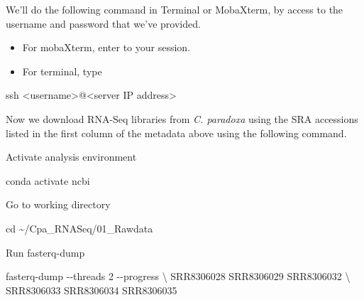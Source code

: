 \documentclass[
  letterpaper,
  DIV=11,
  numbers=noendperiod]{scrreprt}
\newenvironment{Shaded}{\begin{snugshade}}{\end{snugshade}}
\newcommand{\AttributeTok}[1]{\textcolor[rgb]{0.40,0.45,0.13}{#1}}
\newcommand{\BuiltInTok}[1]{\textcolor[rgb]{0.00,0.23,0.31}{#1}}
\newcommand{\DataTypeTok}[1]{\textcolor[rgb]{0.68,0.00,0.00}{#1}}
\newcommand{\ExtensionTok}[1]{\textcolor[rgb]{0.00,0.23,0.31}{#1}}
\newcommand{\FunctionTok}[1]{\textcolor[rgb]{0.28,0.35,0.67}{#1}}
\newcommand{\NormalTok}[1]{\textcolor[rgb]{0.00,0.23,0.31}{#1}}
\newcommand{\OperatorTok}[1]{\textcolor[rgb]{0.37,0.37,0.37}{#1}}
\begin{document}
\begin{tcolorbox}[enhanced jigsaw, breakable, bottomrule=.15mm, left=2mm, coltitle=black, opacityback=0, colframe=quarto-callout-note-color-frame, toprule=.15mm, opacitybacktitle=0.6, colbacktitle=quarto-callout-note-color!10!white, bottomtitle=1mm, colback=white, toptitle=1mm, titlerule=0mm, rightrule=.15mm, arc=.35mm, title=\textcolor{quarto-callout-note-color}{\faInfo}\hspace{0.5em}{Activity}, leftrule=.75mm]

We'll do the following command in Terminal or MobaXterm, by access to
the username and password that we've provided.

\begin{itemize}
\item
  For mobaXterm, enter to your session.
\item
  For terminal, type
\end{itemize}

\begin{Shaded}
\begin{Highlighting}[]
\FunctionTok{ssh} \OperatorTok{\textless{}}\NormalTok{username}\OperatorTok{\textgreater{}}\NormalTok{@}\OperatorTok{\textless{}}\NormalTok{server IP address}\OperatorTok{\textgreater{}}
\end{Highlighting}
\end{Shaded}

Now we download RNA-Seq libraries from \emph{C. paradoxa} using the SRA
accessions listed in the first column of the metadata above using the
following command.

Activate analysis environment

\begin{Shaded}
\begin{Highlighting}[]
\ExtensionTok{conda}\NormalTok{ activate ncbi}
\end{Highlighting}
\end{Shaded}

Go to working directory

\begin{Shaded}
\begin{Highlighting}[]
\BuiltInTok{cd}\NormalTok{ \textasciitilde{}/Cpa\_RNASeq/01\_Rawdata}
\end{Highlighting}
\end{Shaded}

Run fasterq-dump

\begin{Shaded}
\begin{Highlighting}[]
\ExtensionTok{fasterq{-}dump} \AttributeTok{{-}{-}threads}\NormalTok{ 2 }\AttributeTok{{-}{-}progress} \DataTypeTok{\textbackslash{}}
\NormalTok{SRR8306028 SRR8306029 SRR8306032 }\DataTypeTok{\textbackslash{}}
\NormalTok{SRR8306033 SRR8306034 SRR8306035}
\end{Highlighting}
\end{Shaded}


\end{tcolorbox}
\end{document}
